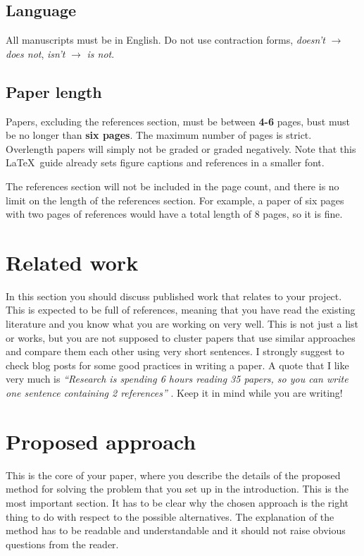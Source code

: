\documentclass[10pt,twocolumn,letterpaper]{article}
\begin{document}
\subsection{Language}

All manuscripts must be in English. Do not use contraction forms, \eg \emph{doesn't} $\xrightarrow{}$ \emph{does not}, \emph{isn't} $\xrightarrow{}$ \emph{is not}.

\subsection{Paper length}
Papers, excluding the references section, must be between \textbf{4-6} pages, bust must be no longer than \textbf{six pages}. The maximum number of pages is strict. Overlength papers will simply not be graded or graded negatively. Note that this \LaTeX\ guide already sets figure captions and references in a smaller font.

The references section will not be included in the page count, and there is no limit on the length of the references section. For example, a paper of six pages with two pages of references would have a total length of 8 pages, so it is fine.


\section{Related work}
In this section you should discuss published work that relates to your project. This is expected to be full of references, meaning that you have read the existing literature and you know what you are working on very well. This is not just a list or works, but you are not supposed to cluster papers that use similar approaches and compare them each other using very short sentences. I strongly suggest to check \cite{steinhardt, lipton} blog posts for some good practices in writing a paper. A quote that I like very much is \emph{``Research is spending 6 hours reading 35 papers, so you can write one sentence containing 2 references''} \cite{twit:ref}. Keep it in mind while you are writing!
\section{Proposed approach}
This is the core of your paper, where you describe the details of the proposed method for solving the problem that you set up in the introduction. This is the most important section. It has to be clear why the chosen approach is the right thing to do with respect to the possible alternatives. The explanation of the method has to be readable and understandable and it should not raise obvious questions from the reader.
\end{document}
